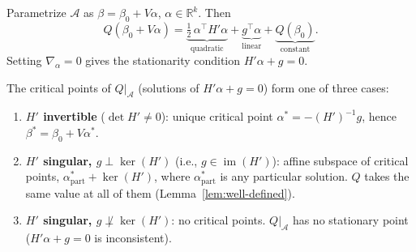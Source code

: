 \begin{proposition}\label{prop:q-on-affine}
Parametrize $\mathcal{A}$ as $\beta = \beta_0 + V\alpha$,
$\alpha \in \mathbb{R}^k$.  Then
\begin{equation}\label{eq:q-restricted}
  Q(\beta_0 + V\alpha)
  = \underbrace{\tfrac{1}{2}\,\alpha^\top H' \alpha}_{\text{quadratic}}
  + \underbrace{g^\top \alpha}_{\text{linear}}
  + \underbrace{Q(\beta_0)}_{\text{constant}}.
\end{equation}
Setting $\nabla_\alpha = 0$ gives the stationarity condition
$H' \alpha + g = 0$.
\end{proposition}

\begin{proposition}\label{prop:critical-points}
The critical points of $Q|_{\mathcal{A}}$
(solutions of $H'\alpha + g = 0$) form one of three cases:
\begin{enumerate}
  \item \textbf{$H'$ invertible} ($\det H' \neq 0$):
    unique critical point $\alpha^* = -(H')^{-1} g$,
    hence $\beta^* = \beta_0 + V\alpha^*$.
  \item \textbf{$H'$ singular, $g \perp \ker(H')$}
    (i.e., $g \in \operatorname{im}(H')$):
    affine subspace of critical points,
    $\alpha^*_{\mathrm{part}} + \ker(H')$,
    where $\alpha^*_{\mathrm{part}}$ is any particular solution.
    $Q$ takes the same value at all of them
    (Lemma~\ref{lem:well-defined}).
  \item \textbf{$H'$ singular, $g \not\perp \ker(H')$}:
    no critical points.
    $Q|_{\mathcal{A}}$ has no stationary point
    ($H'\alpha + g = 0$ is inconsistent).
\end{enumerate}
\end{proposition}

